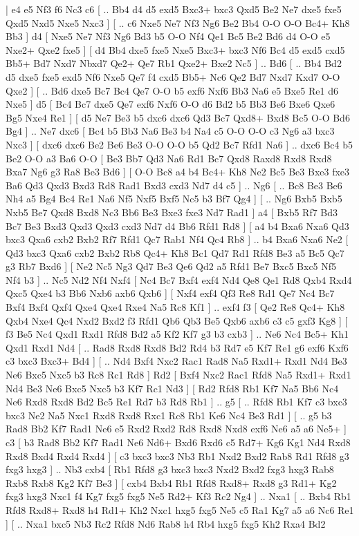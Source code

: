 \makegametitle 
|   e4   e5    Nf3   f6    Nc3   c6 [ .. Bb4  d4 d5  exd5 Bxc3+  bxc3 Qxd5  Be2 Ne7  dxe5 fxe5  Qxd5 Nxd5  Nxe5 Nxc3   ]  [ .. c6  Nxe5 Ne7  Nf3 Ng6  Be2 Bb4  O-O O-O  Bc4+ Kh8  Bb3   ]  d4 [  Nxe5 Ne7  Nf3 Ng6  Bd3 b5  O-O Nf4  Qe1 Bc5  Be2 Bd6  d4 O-O  e5 Nxe2+  Qxe2 fxe5   ]  [  d4 Bb4  dxe5 fxe5  Nxe5 Bxc3+  bxc3 Nf6  Bc4 d5  exd5 cxd5  Bb5+ Bd7  Nxd7 Nbxd7  Qe2+ Qe7  Rb1 Qxe2+  Bxe2 Nc5   ] .. Bd6 [ .. Bb4  Bd2 d5  dxe5 fxe5  exd5 Nf6  Nxe5 Qe7  f4 cxd5  Bb5+ Nc6  Qe2 Bd7  Nxd7 Kxd7  O-O Qxe2   ]  [ .. Bd6  dxe5 Bc7  Bc4 Qe7  O-O b5  exf6 Nxf6  Bb3 Na6  e5 Bxe5  Re1 d6  Nxe5   ]  d5 [  Bc4 Bc7  dxe5 Qe7  exf6 Nxf6  O-O d6  Bd2 b5  Bb3 Be6  Bxe6 Qxe6  Bg5 Nxe4  Re1   ]  [  d5 Ne7  Be3 b5  dxc6 dxc6  Qd3 Bc7  Qxd8+ Bxd8  Bc5 O-O  Bd6 Bg4   ] .. Ne7    dxc6 [  Bc4 b5  Bb3 Na6  Be3 b4  Na4 c5  O-O O-O  c3 Ng6  a3 bxc3  Nxc3   ]  [  dxc6 dxc6  Be2 Be6  Be3 O-O  O-O b5  Qd2 Bc7  Rfd1 Na6   ] .. dxc6    Bc4   b5    Be2   O-O    a3   Ba6    O-O [  Be3 Bb7  Qd3 Na6  Rd1 Bc7  Qxd8 Raxd8  Rxd8 Rxd8  Bxa7 Ng6  g3 Ra8  Be3 Bd6   ]  [  O-O Bc8  a4 b4  Bc4+ Kh8  Ne2 Bc5  Be3 Bxe3  fxe3 Ba6  Qd3 Qxd3  Bxd3 Rd8  Rad1 Bxd3  cxd3 Nd7  d4 c5   ] .. Ng6 [ .. Bc8  Be3 Be6  Nh4 a5  Bg4 Bc4  Re1 Na6  Nf5 Nxf5  Bxf5 Nc5  b3 Bf7  Qg4   ]  [ .. Ng6  Bxb5 Bxb5  Nxb5 Be7  Qxd8 Bxd8  Nc3 Bb6  Be3 Bxe3  fxe3 Nd7  Rad1   ]  a4 [  Bxb5 Rf7  Bd3 Bc7  Be3 Bxd3  Qxd3 Qxd3  cxd3 Nd7  d4 Bb6  Rfd1 Rd8   ]  [  a4 b4  Bxa6 Nxa6  Qd3 bxc3  Qxa6 cxb2  Bxb2 Rf7  Rfd1 Qc7  Rab1 Nf4  Qc4 Rb8   ] .. b4    Bxa6   Nxa6    Ne2 [  Qd3 bxc3  Qxa6 cxb2  Bxb2 Rb8  Qc4+ Kh8  Bc1 Qd7  Rd1 Rfd8  Be3 a5  Bc5 Qc7  g3 Rb7  Bxd6   ]  [  Ne2 Nc5  Ng3 Qd7  Be3 Qe6  Qd2 a5  Rfd1 Be7  Bxc5 Bxc5  Nf5 Nf4  b3   ] .. Nc5    Nd2   Nf4    Nxf4 [  Nc4 Bc7  Bxf4 exf4  Nd4 Qe8  Qe1 Rd8  Qxb4 Rxd4  Qxc5 Qxe4  b3 Bb6  Nxb6 axb6  Qxb6   ]  [  Nxf4 exf4  Qf3 Re8  Rd1 Qe7  Nc4 Bc7  Bxf4 Bxf4  Qxf4 Qxe4  Qxe4 Rxe4  Na5 Rc8  Kf1   ] .. exf4    f3 [  Qe2 Re8  Qc4+ Kh8  Qxb4 Nxe4  Qc4 Nxd2  Bxd2 f3  Rfd1 Qb6  Qb3 Be5  Qxb6 axb6  c3 c5  gxf3 Kg8   ]  [  f3 Be5  Nc4 Qxd1  Rxd1 Rfd8  Bd2 a5  Kf2 Kf7  g3 b3  cxb3   ] .. Ne6    Nc4   Bc5+    Kh1   Qxd1    Rxd1   Nd4 [ .. Rad8  Rxd8 Rxd8  Bd2 Rd4  b3 Rd7  e5 Kf7  Re1 g6  exf6 Kxf6  c3 bxc3  Bxc3+ Bd4   ]  [ .. Nd4  Bxf4 Nxc2  Rac1 Rad8  Na5 Rxd1+  Rxd1 Nd4  Be3 Ne6  Bxc5 Nxc5  b3 Rc8  Rc1 Rd8   ]  Rd2 [  Bxf4 Nxc2  Rac1 Rfd8  Na5 Rxd1+  Rxd1 Nd4  Be3 Ne6  Bxc5 Nxc5  b3 Kf7  Rc1 Nd3   ]  [  Rd2 Rfd8  Rb1 Kf7  Na5 Bb6  Nc4 Ne6  Rxd8 Rxd8  Bd2 Bc5  Re1 Rd7  b3 Rd8  Rb1   ] .. g5 [ .. Rfd8  Rb1 Kf7  c3 bxc3  bxc3 Ne2  Na5 Nxc1  Rxd8 Rxd8  Rxc1 Rc8  Rb1 Ke6  Nc4 Be3  Rd1   ]  [ .. g5  b3 Rad8  Bb2 Kf7  Rad1 Ne6  e5 Rxd2  Rxd2 Rd8  Rxd8 Nxd8  exf6 Ne6  a5 a6  Ne5+   ]  c3 [  b3 Rad8  Bb2 Kf7  Rad1 Ne6  Nd6+ Bxd6  Rxd6 c5  Rd7+ Kg6  Kg1 Nd4  Rxd8 Rxd8  Bxd4 Rxd4  Rxd4   ]  [  c3 bxc3  bxc3 Nb3  Rb1 Nxd2  Bxd2 Rab8  Rd1 Rfd8  g3 fxg3  hxg3   ] .. Nb3    cxb4 [  Rb1 Rfd8  g3 bxc3  bxc3 Nxd2  Bxd2 fxg3  hxg3 Rab8  Rxb8 Rxb8  Kg2 Kf7  Be3   ]  [  cxb4 Bxb4  Rb1 Rfd8  Rxd8+ Rxd8  g3 Rd1+  Kg2 fxg3  hxg3 Nxc1  f4 Kg7  fxg5 fxg5  Ne5 Rd2+  Kf3 Rc2  Ng4   ] .. Nxa1 [ .. Bxb4  Rb1 Rfd8  Rxd8+ Rxd8  h4 Rd1+  Kh2 Nxc1  hxg5 fxg5  Ne5 c5  Ra1 Kg7  a5 a6  Nc6 Re1   ]  [ .. Nxa1  bxc5 Nb3  Rc2 Rfd8  Nd6 Rab8  h4 Rb4  hxg5 fxg5  Kh2 Rxa4  Bd2 